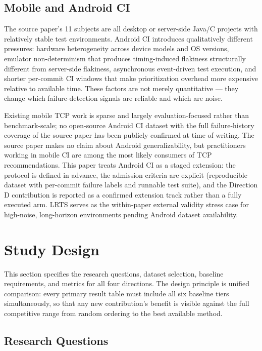 \documentclass[conference]{IEEEtran}
\begin{document}
\subsection{Mobile and Android CI}

The source paper's 11 subjects are all desktop or server-side Java/C projects with relatively stable test environments. Android CI introduces qualitatively different pressures: hardware heterogeneity across device models and OS versions, emulator non-determinism that produces timing-induced flakiness structurally different from server-side flakiness, asynchronous event-driven test execution, and shorter per-commit CI windows that make prioritization overhead more expensive relative to available time. These factors are not merely quantitative — they change which failure-detection signals are reliable and which are noise.


Existing mobile TCP work is sparse and largely evaluation-focused rather than benchmark-scale; no open-source Android CI dataset with the full failure-history coverage of the source paper has been publicly confirmed at time of writing. The source paper makes no claim about Android generalizability, but practitioners working in mobile CI are among the most likely consumers of TCP recommendations. This paper treats Android CI as a staged extension: the protocol is defined in advance, the admission criteria are explicit (reproducible dataset with per-commit failure labels and runnable test suite), and the Direction D contribution is reported as a confirmed extension track rather than a fully executed arm. LRTS serves as the within-paper external validity stress case for high-noise, long-horizon environments pending Android dataset availability.




\section{Study Design}

This section specifies the research questions, dataset selection, baseline requirements, and metrics for all four directions. The design principle is unified comparison: every primary result table must include all six baseline tiers simultaneously, so that any new contribution's benefit is visible against the full competitive range from random ordering to the best available method.


\subsection{Research Questions}
\end{document}
